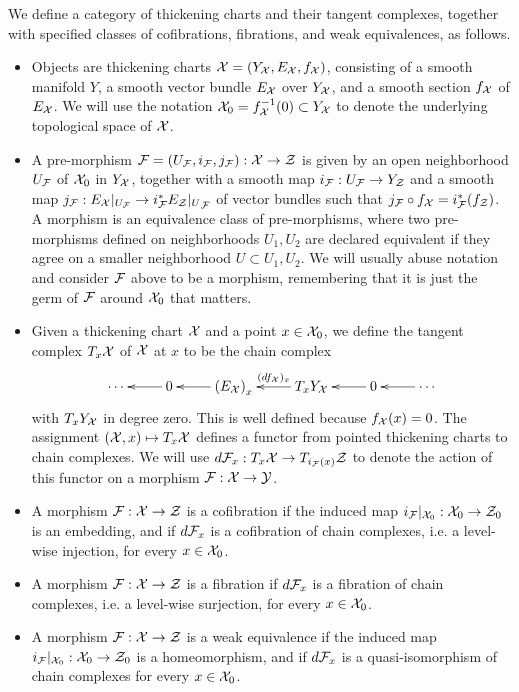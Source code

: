 \begin{definition}\label{thickening-model-structure}
We define a category of thickening charts and their tangent complexes, together with specified classes of cofibrations, fibrations, and weak equivalences, as follows.
\begin{itemize}

\item Objects are thickening charts $\mathcal X = (Y_\mathcal X, E_\mathcal X, f_\mathcal X)$, consisting of a smooth manifold $Y$, a smooth vector bundle $E_\mathcal X$ over $Y_\mathcal X$, and a smooth section $f_\mathcal X$ of $E_\mathcal X$. We will use the notation $\mathcal X_0 = f_\mathcal X^{-1}(0) \subset Y_\mathcal X$ to denote the underlying topological space of $\mathcal X$.

\item A pre-morphism $\mathcal F = (U_\mathcal F, i_\mathcal F, j_\mathcal F): \mathcal X \to \mathcal Z$ is given by an open neighborhood $U_\mathcal F$ of $\mathcal X_0$ in $Y_\mathcal X$, together with a smooth map $i_\mathcal F: U_\mathcal F \to Y_\mathcal Z$ and a smooth map $j_\mathcal F: {E_\mathcal X|_{U_\mathcal F}} \to {i_\mathcal F^* E_\mathcal Z|_{U}}_{\mathcal F}$ of vector bundles such that $j_\mathcal F \circ f_\mathcal X = i_\mathcal F^*(f_\mathcal Z)$. A morphism is an equivalence class of pre-morphisms, where two pre-morphisms defined on neighborhoods $U_1, U_2$ are declared equivalent if they agree on a smaller neighborhood $U \subset U_1, U_2$. We will usually abuse notation and consider $\mathcal F$ above to be a morphism, remembering that it is just the germ of $\mathcal F$ around $\mathcal X_0$ that matters.

\item Given a thickening chart $\mathcal X$ and a point $x \in \mathcal X_0$, we define the tangent complex $T_x \mathcal X$ of $\mathcal X$ at $x$ to be the chain complex
\[\xymatrix{ \cdots & 0 \ar[l] & \left(E_\cX\right)_x \ar[l] & T_x Y_\cX \ar[l]_-{(df_\cX)_x} & 0 \ar[l] & \cdots \ar[l] }\]
with $T_x Y_\mathcal X$ in degree zero. This is well defined because $f_\mathcal X(x) = 0$. The assignment $(\mathcal X, x) \mapsto T_x \mathcal X$ defines a functor from pointed thickening charts to chain complexes. We will use $d \mathcal F_x: T_x \mathcal X \to T_{i_\mathcal F(x)} \mathcal Z$ to denote the action of this functor on a morphism $\mathcal F: \mathcal X \to \mathcal Y$.

\item A morphism $\mathcal F : \mathcal X \to \mathcal Z$ is a cofibration if the induced map ${i_\mathcal F|_{\mathcal X_0}}: \mathcal X_0 \to \mathcal Z_0$ is an embedding, and if $d \mathcal F_x$ is a cofibration of chain complexes, i.e. a level-wise injection, for every $x \in \mathcal X_0$.

\item A morphism $\mathcal F : \mathcal X \to \mathcal Z$ is a fibration if $d \mathcal F_x$ is a fibration of chain complexes, i.e. a level-wise surjection, for every $x \in \mathcal X_0$.

\item A morphism $\mathcal F : \mathcal X \to \mathcal Z$ is a weak equivalence if the induced map ${i_\mathcal F|_{\mathcal X_0}}: \mathcal X_0 \to \mathcal Z_0$ is a homeomorphism, and if $d \mathcal F_x$ is a quasi-isomorphism of chain complexes for every $x \in \mathcal X_0$.

\end{itemize}
\end{definition}

